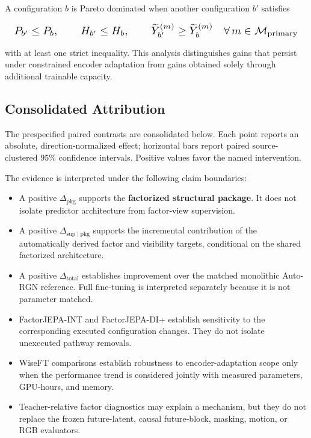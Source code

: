 A configuration \(b\) is Pareto dominated when another configuration
\(b'\) satisfies

\begin{equation*}
\resizebox{0.98\columnwidth}{!}{$\displaystyle
P_{b'}\le P_b,
\qquad
H_{b'}\le H_b,
\qquad
\widetilde Y_{b'}^{(m)}
\ge
\widetilde Y_b^{(m)}
\quad
\forall\,m\in\mathcal M_{\mathrm{primary}}
$}
\end{equation*}

with at least one strict inequality. This analysis distinguishes gains
that persist under constrained encoder adaptation from gains obtained
solely through additional trainable capacity.


\subsection{Consolidated Attribution}
\label{app:attribution_summary}

The prespecified paired contrasts are consolidated below. Each point reports an absolute,
direction-normalized effect; horizontal bars report paired
source-clustered \(95\%\) confidence intervals. Positive values favor
the named intervention.



The evidence is interpreted under the following claim boundaries:

\begin{itemize}
    \item A positive \(\Delta_{\mathrm{pkg}}\) supports the
    \textbf{factorized structural package}. It does not isolate
    predictor architecture from factor-view supervision.

    \item A positive
    \(\Delta_{\mathrm{sup}\mid\mathrm{pkg}}\) supports the incremental
    contribution of the automatically derived factor and visibility targets,
    conditional on the shared factorized architecture.

    \item A positive \(\Delta_{\mathrm{total}}\) establishes improvement
    over the matched monolithic Auto-RGN reference. Full fine-tuning is
    interpreted separately because it is not parameter matched.

    \item FactorJEPA-INT and FactorJEPA-DI+ establish sensitivity to the
    corresponding executed configuration changes. They do not isolate
    unexecuted pathway removals.

    \item WiseFT comparisons establish robustness to encoder-adaptation
    scope only when the performance trend is considered jointly with
    measured parameters, GPU-hours, and memory.

    \item Teacher-relative factor diagnostics may explain a mechanism,
    but they do not replace the frozen future-latent, causal future-block,
    masking, motion, or RGB evaluators.
\end{itemize}


